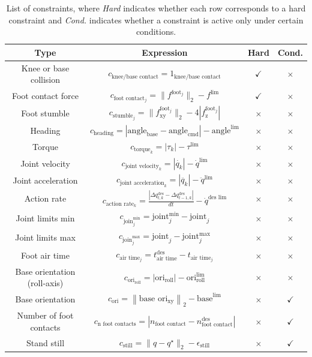 \begin{table}[h]
\centering
\begin{tabular}{c|c|c|c}
\toprule
Type & Expression & Hard & Cond. \\
\midrule
Knee or base collision & $c_\text{knee/base contact} = 1_\text{knee/base contact}$ & $\checkmark$ & $\times$ \\
Foot contact force & $c_{\text{foot contact}_j} = \|f^{\text{foot}_j}\|_2 - f^\text{lim}$  & $\checkmark$ & $\times$ \\
Foot stumble  & $c_{\text{stumble}_j} = \|f^{\text{foot}_j}_\text{xy}\|_2 - 4 |f^{\text{foot}_j}_\text{z}|$ & $\times$ & $\times$ \\
Heading  & $c_{\text{heading}} = |\text{angle}_\text{base} - \text{angle}_\text{cmd}| - \text{angle}^\text{lim} $ & $\times$ & $\times$ \\
Torque  & $c_{\text{torque}_k} = |\tau_k| - \tau^\text{lim}$ & $\times$ & $\times$ \\
Joint velocity  & $c_{\text{joint velocity}_k}= |\dot{q_k}| - \dot{q}^\text{lim}$  & $\times$ & $\times$ \\
Joint acceleration & $c_{\text{joint acceleration}_k}= |\ddot{q_k}| - \ddot{q}^\text{lim}$ & $\times$ & $\times$ \\
Action rate  & $c_{\text{action rate}_k}= \frac{\left | \Delta q^\text{des}_{t, k} - \Delta q^\text{des}_{t-1, k} \right |}{dt} - \dot{q}^\text{des lim}$ & $\times$ & $\times$ \\

Joint limits min & $c_{\text{join}^\text{min}_j} = \text{joint}^\text{min}_j - \text{joint}_j$ & $\times$ & $\times$ \\
Joint limits max & $c_{\text{join}^\text{max}_j} =  \text{joint}_j - \text{joint}^\text{max}_j$ & $\times$ & $\times$ \\
Foot air time & $c_{\text{air time}_j} = t_\text{air time}^\text{des} - t_{\text{air time}_j}$ & $\times$ & $\times$ \\
Base orientation (roll-axis) & $c_{\text{ori}_\text{roll}} = | \text{ori}_\text{roll} | - \text{ori}^\text{lim}_\text{roll}$ & $\times$ & $\times$ \\
Base orientation & $c_\text{ori} = \left \| \text{base ori}_{\text{xy}} \right \|_2 - \text{base}^\text{lim}$ & $\times$ & $\checkmark$ \\
Number of foot contacts & $c_\text{n foot contacts} = |n_\text{foot contact} - n_\text{foot contact}^\text{des}|$ & $\times$ & $\checkmark$  \\
Stand still & $c_{\text{still}}= \|q - q^\star \|_2 - \epsilon_\text{still}$ & $\times$ & $\checkmark$ \\
\bottomrule
\end{tabular}
\vspace{0.3cm}
\caption{List of constraints, where \textit{Hard} indicates whether each row corresponds to a hard constraint and \textit{Cond.} indicates whether a constraint is active only under certain conditions.}
\label{table:constraint_list}
\end{table}

